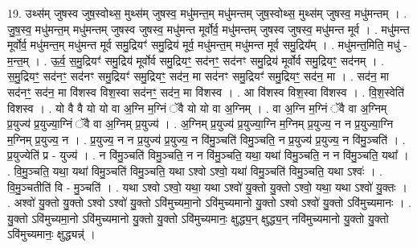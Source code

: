 \documentclass[17pt]{extarticle}
\begin{document}
19. उथ्स॑म् जुषस्व जुष॒स्वोथ्स॒ मुथ्स॑म् जुषस्व॒ मधु॑मन्त॒म् मधु॑मन्तम् जुष॒स्वोथ्स॒ मुथ्स॑म् जुषस्व॒ मधु॑मन्तम् । . जु॒ष॒स्व॒ मधु॑मन्त॒म् मधु॑मन्तम् जुषस्व जुषस्व॒ मधु॑मन्त मूर्वोर्व॒ मधु॑मन्तम् जुषस्व जुषस्व॒ मधु॑मन्त मूर्व । . मधु॑मन्त मूर्वोर्व॒ मधु॑मन्त॒म् मधु॑मन्त मूर्व समु॒द्रियꣳ॑ समु॒द्रिय॑ मूर्व॒ मधु॑मन्त॒म् मधु॑मन्त मूर्व समु॒द्रिय᳚म् । . मधु॑मन्त॒मिति॒ मधु॑ - म॒न्त॒म् । . ऊ॒र्व॒ स॒मु॒द्रियꣳ॑ समु॒द्रिय॑ मूर्वोर्व समु॒द्रियꣳ॒॒ सद॑नꣳ॒॒ सद॑नꣳ समु॒द्रिय॑ मूर्वोर्व समु॒द्रियꣳ॒॒ सद॑नम् । . स॒मु॒द्रियꣳ॒॒ सद॑नꣳ॒॒ सद॑नꣳ समु॒द्रियꣳ॑ समु॒द्रियꣳ॒॒ सद॑न॒ मा सद॑नꣳ समु॒द्रियꣳ॑ समु॒द्रियꣳ॒॒ सद॑न॒ मा । . सद॑न॒ मा सद॑नꣳ॒॒ सद॑न॒ मा वि॑शस्व विश॒स्वा सद॑नꣳ॒॒ सद॑न॒ मा वि॑शस्व । . आ वि॑शस्व विश॒स्वा वि॑शस्व । . वि॒श॒स्वेति॑ विशस्व । . यो वै वै यो यो वा अ॒ग्नि म॒ग्निं ॅवै यो यो वा अ॒ग्निम् । . वा अ॒ग्नि म॒ग्निं ॅवै वा अ॒ग्निम् प्र॒युज्य॑ प्र॒युज्या॒ग्निं ॅवै वा अ॒ग्निम् प्र॒युज्य॑ । . अ॒ग्निम् प्र॒युज्य॑ प्र॒युज्या॒ग्नि म॒ग्निम् प्र॒युज्य॒ न न प्र॒युज्या॒ग्नि म॒ग्निम् प्र॒युज्य॒ न । . प्र॒युज्य॒ न न प्र॒युज्य॑ प्र॒युज्य॒ न वि॑मु॒ञ्चति॑ विमु॒ञ्चति॒ न प्र॒युज्य॑ प्र॒युज्य॒ न वि॑मु॒ञ्चति॑ । . प्र॒युज्येति॑ प्र - युज्य॑ । . न वि॑मु॒ञ्चति॑ विमु॒ञ्चति॒ न न वि॑मु॒ञ्चति॒ यथा॒ यथा॑ विमु॒ञ्चति॒ न न वि॑मु॒ञ्चति॒ यथा᳚ । . वि॒मु॒ञ्चति॒ यथा॒ यथा॑ विमु॒ञ्चति॑ विमु॒ञ्चति॒ यथा ऽश्वो ऽश्वो॒ यथा॑ विमु॒ञ्चति॑ विमु॒ञ्चति॒ यथा ऽश्वः॑ । . वि॒मु॒ञ्चतीति॑ वि - मु॒ञ्चति॑ । . यथा ऽश्वो ऽश्वो॒ यथा॒ यथा ऽश्वो॑ यु॒क्तो यु॒क्तो ऽश्वो॒ यथा॒ यथा ऽश्वो॑ यु॒क्तः । . अश्वो॑ यु॒क्तो यु॒क्तो ऽश्वो ऽश्वो॑ यु॒क्तो ऽवि॑मुच्यमा॒नो ऽवि॑मुच्यमानो यु॒क्तो ऽश्वो ऽश्वो॑ यु॒क्तो ऽवि॑मुच्यमानः । . यु॒क्तो ऽवि॑मुच्यमा॒नो ऽवि॑मुच्यमानो यु॒क्तो यु॒क्तो ऽवि॑मुच्यमानः॒ क्षुद्ध्य॒न् क्षुद्ध्य॒न् नवि॑मुच्यमानो यु॒क्तो यु॒क्तो ऽवि॑मुच्यमानः॒ क्षुद्ध्यन्न्॑ । \newline
\end{document}
